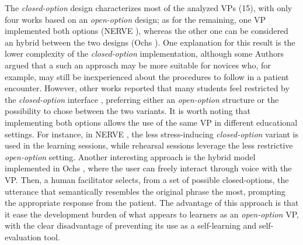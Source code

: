 The \textit{closed-option} design characterizes most of the analyzed VPs (15), with only four works  based on an \textit{open-option} design; as for the remaining, one VP implemented both options (NERVE \cite{hirumi2016advancingPart2,hirumi2016advancing,kleinsmith2015understanding}), whereas the other one can be considered an hybrid between the two designs (Ochs \cite{ochs2019training}). One explanation for this result is the lower complexity of the \textit{closed-option} implementation, although some Authors \cite{carnell2015adapting,jacklin2019virtual} argued that a such an approach may be more suitable for novices who, for example, may still be inexperienced about the procedures to follow in a patient encounter. However, other works reported that many students feel restricted by the \textit{closed-option} interface \cite{dupuy2019virtual,hirumi2016advancing,jacklin2019virtual,peddle2019development}, preferring either an \textit{open-option} structure or the possibility to chose between the two variants. It is worth noting that implementing both options allows the use of the same VP in different educational settings. %
For instance, in NERVE \cite{hirumi2016advancingPart2,hirumi2016advancing,kleinsmith2015understanding}, the less stress-inducing \textit{closed-option} variant is used in the learning sessions, while rehearsal sessions leverage the less restrictive \textit{open-option} setting. 
Another interesting approach is the hybrid model implemented in Ochs \cite{ochs2019training}, where the user can freely interact through voice with the VP. Then, a human facilitator selects, from a set of possible closed-options, the utterance that semantically resembles the original phrase the most, prompting the appropriate response from the patient. The advantage of this approach is that it ease the development burden of what appears to learners as an \textit{open-option} VP, with the clear disadvantage of preventing its use as a self-learning and self-evaluation tool.



